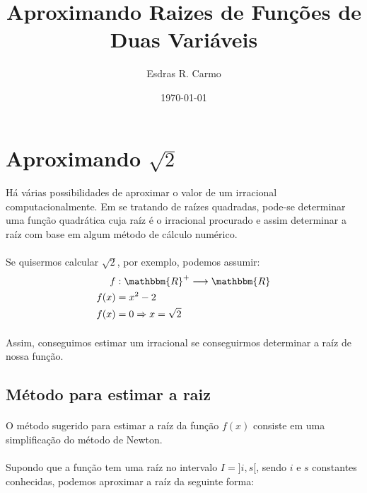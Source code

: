 \documentclass{article}
\author{Esdras R. Carmo}
\title{Aproximando Raizes de Funções de Duas Variáveis}
\date{\today}
\begin{document}
    \maketitle

    \section{Aproximando $\sqrt{2}$}
        \paragraph{}
        Há várias possibilidades de aproximar o valor de um irracional computacionalmente.
        Em se tratando de raízes quadradas, pode-se determinar uma função quadrática cuja
        raíz é o irracional procurado e assim determinar a raíz com base em algum método de cálculo numérico.

        \paragraph{}
        Se quisermos calcular $\sqrt{2}$, por exemplo, podemos assumir:
        \begin{align*}
            f&: \mathbbm{R}^+ \longrightarrow \mathbbm{R}\\
            f(x) &= x^2 - 2\\
            f(x) &= 0 \Rightarrow x = \sqrt{2}
        \end{align*}

        \paragraph{}
        Assim, conseguimos estimar um irracional se conseguirmos determinar a raíz de nossa função.

        \subsection{Método para estimar a raiz}
            \paragraph{}
            O método sugerido para estimar a raíz da função $f(x)$ consiste em uma simplificação
            do método de Newton.
            \paragraph{}
            Supondo que a função tem uma raíz no intervalo $I = ]i, s[$, sendo
            $i$ e $s$ constantes conhecidas, podemos aproximar a raíz da seguinte forma:
\end{document}
